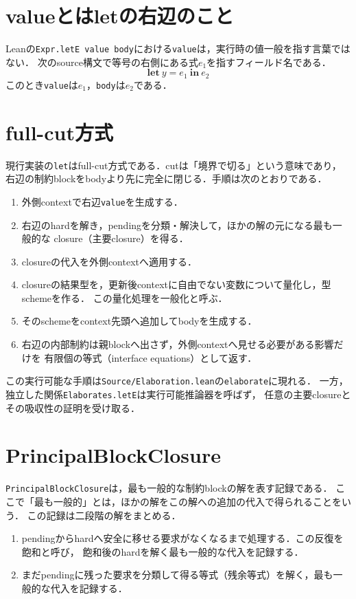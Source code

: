 \documentclass[11pt,a4paper,oneside]{ltjsbook}
\newcommand{\code}[1]{\texttt{#1}}
\begin{document}
\section{valueとはletの右辺のこと}

Leanの\code{Expr.letE value body}における\code{value}は，実行時の値一般を指す言葉ではない．
次のsource構文で等号の右側にある式$e_1$を指すフィールド名である．
\[
  \mathbf{let}\ y=e_1\ \mathbf{in}\ e_2
\]
このとき\code{value}は$e_1$，\code{body}は$e_2$である．

\section{full-cut方式}

現行実装の\code{let}はfull-cut方式である．cutは「境界で切る」という意味であり，
右辺の制約blockをbodyより先に完全に閉じる．手順は次のとおりである．

\begin{enumerate}[leftmargin=2em]
  \item 外側contextで右辺\code{value}を生成する．
  \item 右辺のhardを解き，pendingを分類・解決して，ほかの解の元になる最も一般的な
        closure（主要closure）を得る．
  \item closureの代入を外側contextへ適用する．
  \item closureの結果型を，更新後contextに自由でない変数について量化し，型schemeを作る．
        この量化処理を一般化と呼ぶ．
  \item そのschemeをcontext先頭へ追加してbodyを生成する．
  \item 右辺の内部制約は親blockへ出さず，外側contextへ見せる必要がある影響だけを
        有限個の等式（interface equations）として返す．
\end{enumerate}

この実行可能な手順は\code{Source/Elaboration.lean}の\code{elaborate}に現れる．
一方，独立した関係\code{Elaborates.letE}は実行可能推論器を呼ばず，
任意の主要closureとその吸収性の証明を受け取る．

\section{PrincipalBlockClosure}

\code{PrincipalBlockClosure}は，最も一般的な制約blockの解を表す記録である．
ここで「最も一般的」とは，ほかの解をこの解への追加の代入で得られることをいう．
この記録は二段階の解をまとめる．

\begin{enumerate}[leftmargin=2em]
  \item pendingからhardへ安全に移せる要求がなくなるまで処理する．この反復を飽和と呼び，
        飽和後のhardを解く最も一般的な代入を記録する．
  \item まだpendingに残った要求を分類して得る等式（残余等式）を解く，最も一般的な代入を記録する．
\end{enumerate}
\end{document}
